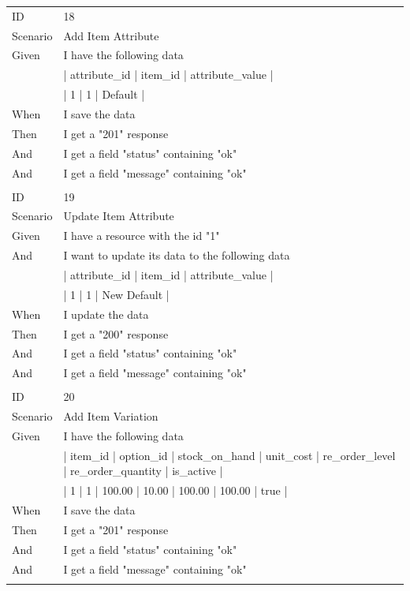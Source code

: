 \documentclass{report}
\begin{document}
\begin{tabular}{ l l }
ID 			& 18\\
Scenario		& Add Item Attribute \\
Given 		& I have the following data \\
	      	& | attribute\_id | item\_id | attribute\_value | \\
      		& | 1            | 1       | Default         | \\
When 		& I save the data \\
Then 		& I get a "201" response \\
And 			& I get a field "status" containing "ok" \\ 
And 			& I get a field "message" containing "ok" \\ \\
ID 			& 19\\
Scenario		& Update Item Attribute \\
Given 		& I have a resource with the id "1" \\
And 			& I want to update its data to the following data \\
      		& | attribute\_id | item\_id | attribute\_value | \\
      		& | 1            | 1       | New Default     | \\
When 		& I update the data \\
Then 		& I get a "200" response \\
And 			& I get a field "status" containing "ok" \\
And 			& I get a field "message" containing "ok" \\ \\
ID 			& 20\\
Scenario		& Add Item Variation \\
Given 		& I have the following data \\
	      	& | item\_id | option\_id | stock\_on\_hand | unit\_cost | re\_order\_level | re\_order\_quantity | is\_active | \\
      		& | 1       | 1         | 100.00        | 10.00     | 100.00         | 100.00            | true      | \\
When 		& I save the data \\
Then 		& I get a "201" response \\
And			& I get a field "status" containing "ok" \\
And 			& I get a field "message" containing "ok" \\ \\

\end{tabular}
\end{document}
